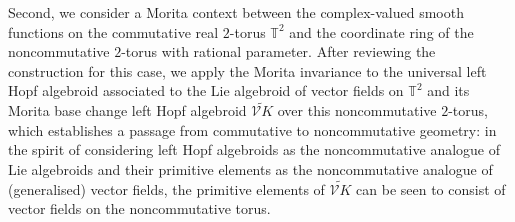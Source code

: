 \documentclass[reqno, a4paper, 10pt]{amsart}
\numberwithin{equation}{section}
\theoremstyle{plain}
\theoremstyle{definition}
\theoremstyle{remark}
\begin{document}
Second, we consider a Morita context between the complex-valued smooth functions on the commutative real $2$-torus  $\mathbb{T}^2$ 
and the coordinate ring of the noncommutative $2$-torus with rational parameter. After reviewing the construction for this case, we apply the Morita invariance to the universal left Hopf algebroid associated to the  Lie algebroid of vector fields on $\mathbb{T}^2$ and its Morita base change left Hopf algebroid $\widetilde{{{\mathcal V}} K}$ over this noncommutative $2$-torus, which establishes a passage from commutative to noncommutative geometry: in the spirit of considering left Hopf algebroids as the noncommutative analogue of Lie algebroids and their primitive elements as the noncommutative analogue of (generalised) vector fields, the primitive elements of $\widetilde{{{\mathcal V}} K}$ can be seen to consist of vector fields on the noncommutative torus.
\end{document}
